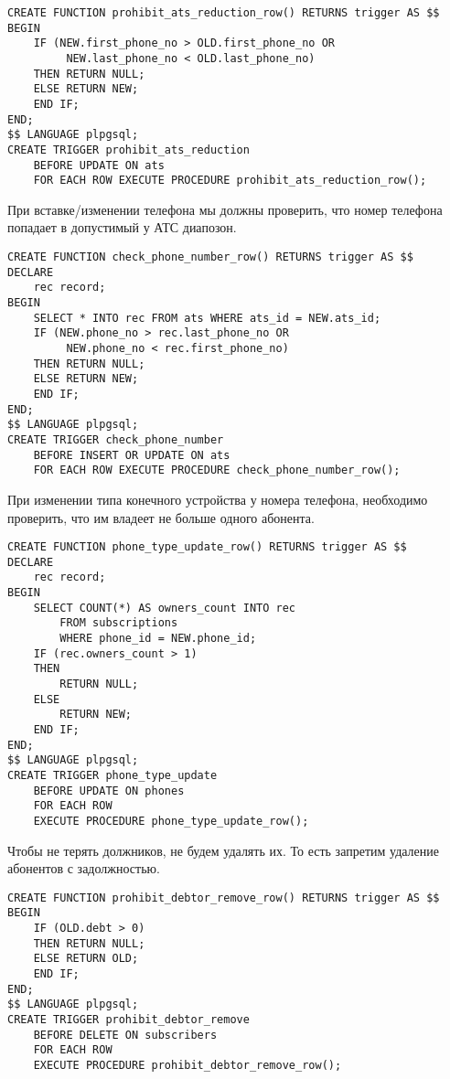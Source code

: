 \documentclass{report}
\begin{document}
\begin{lstlisting}
CREATE FUNCTION prohibit_ats_reduction_row() RETURNS trigger AS $$
BEGIN
    IF (NEW.first_phone_no > OLD.first_phone_no OR
         NEW.last_phone_no < OLD.last_phone_no)
    THEN RETURN NULL;
    ELSE RETURN NEW;
    END IF;
END;
$$ LANGUAGE plpgsql;
CREATE TRIGGER prohibit_ats_reduction 
    BEFORE UPDATE ON ats
    FOR EACH ROW EXECUTE PROCEDURE prohibit_ats_reduction_row();
\end{lstlisting}

При вставке/изменении телефона мы должны проверить, 
что номер телефона попадает в допустимый у АТС диапозон.

\begin{lstlisting}
CREATE FUNCTION check_phone_number_row() RETURNS trigger AS $$
DECLARE
    rec record;
BEGIN
    SELECT * INTO rec FROM ats WHERE ats_id = NEW.ats_id;
    IF (NEW.phone_no > rec.last_phone_no OR
         NEW.phone_no < rec.first_phone_no)
    THEN RETURN NULL;
    ELSE RETURN NEW;
    END IF;
END;
$$ LANGUAGE plpgsql;
CREATE TRIGGER check_phone_number 
    BEFORE INSERT OR UPDATE ON ats
    FOR EACH ROW EXECUTE PROCEDURE check_phone_number_row();
\end{lstlisting}

При изменении типа конечного устройства у номера телефона, необходимо проверить,
что им владеет не больше одного абонента.

\begin{lstlisting}
CREATE FUNCTION phone_type_update_row() RETURNS trigger AS $$
DECLARE
    rec record;
BEGIN
    SELECT COUNT(*) AS owners_count INTO rec 
        FROM subscriptions
        WHERE phone_id = NEW.phone_id;
    IF (rec.owners_count > 1)
    THEN
        RETURN NULL;
    ELSE
        RETURN NEW;
    END IF;
END;
$$ LANGUAGE plpgsql;
CREATE TRIGGER phone_type_update 
    BEFORE UPDATE ON phones
    FOR EACH ROW 
    EXECUTE PROCEDURE phone_type_update_row();
\end{lstlisting}

Чтобы не терять должников, не будем удалять их. То есть запретим
удаление абонентов с задолжностью.

\begin{lstlisting}
CREATE FUNCTION prohibit_debtor_remove_row() RETURNS trigger AS $$
BEGIN
    IF (OLD.debt > 0)
    THEN RETURN NULL;
    ELSE RETURN OLD;
    END IF;
END;
$$ LANGUAGE plpgsql;
CREATE TRIGGER prohibit_debtor_remove 
    BEFORE DELETE ON subscribers
    FOR EACH ROW 
    EXECUTE PROCEDURE prohibit_debtor_remove_row();
\end{lstlisting}
\end{document}

